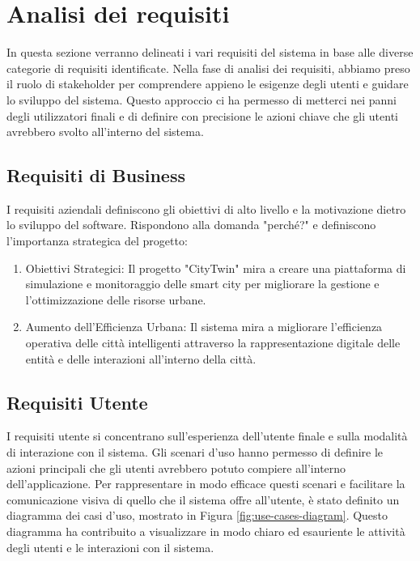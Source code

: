 \documentclass{scrartcl}
\begin{document}
\section{Analisi dei requisiti}
In questa sezione verranno delineati i vari requisiti del sistema in base alle diverse categorie di requisiti identificate. Nella fase di analisi dei requisiti, abbiamo preso il ruolo di stakeholder per comprendere appieno le esigenze degli utenti e guidare lo sviluppo del sistema. Questo approccio ci ha permesso di metterci nei panni degli utilizzatori finali e di definire con precisione le azioni chiave che gli utenti avrebbero svolto all'interno del sistema.

\subsection{Requisiti di Business}
I requisiti aziendali definiscono gli obiettivi di alto livello e la motivazione dietro lo sviluppo del software. Rispondono alla domanda "perché?" e definiscono l'importanza strategica del progetto:
\begin{enumerate}
    \item Obiettivi Strategici: Il progetto "CityTwin" mira a creare una piattaforma di simulazione e monitoraggio delle smart city per migliorare la gestione e l'ottimizzazione delle risorse urbane.
    \item Aumento dell'Efficienza Urbana: Il sistema mira a migliorare l'efficienza operativa delle città intelligenti attraverso la rappresentazione digitale delle entità e delle interazioni all'interno della città.
\end{enumerate}

\subsection{Requisiti Utente}
I requisiti utente si concentrano sull'esperienza dell'utente finale e sulla modalità di interazione con il sistema.
Gli scenari d'uso hanno permesso di definire le azioni principali che gli utenti avrebbero potuto compiere all'interno dell'applicazione.
Per rappresentare in modo efficace questi scenari e facilitare la comunicazione visiva di quello che il sistema offre all'utente, è stato definito un diagramma dei casi d'uso, mostrato in Figura \ref{fig:use-cases-diagram}. Questo diagramma ha contribuito a visualizzare in modo chiaro ed esauriente le attività degli utenti e le interazioni con il sistema.
\end{document}
